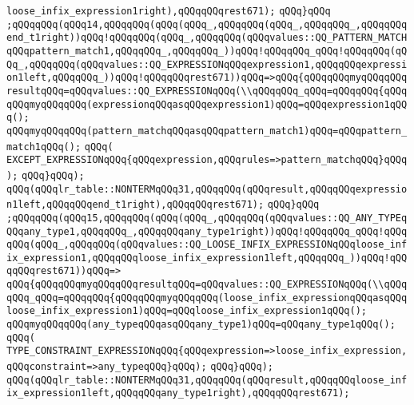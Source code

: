 \verb|loose_infix_expression1right),qQQqqQQqrest671);|\newline
\verb|qQQq}qQQq|\newline
\verb|;qQQqqQQq(qQQq14,qQQqqQQq(qQQq(qQQq_,qQQqqQQq(qQQq_,qQQqqQQq_,qQQqqQQqend_t1right))qQQq!qQQqqQQq(qQQq_,qQQqqQQq(qQQqvalues::QQ_PATTERN_MATCHqQQqpattern_match1,qQQqqQQq_,qQQqqQQq_))qQQq!qQQqqQQq_qQQq!qQQqqQQq(qQQq_,qQQqqQQq(qQQqvalues::QQ_EXPRESSIONqQQqexpression1,qQQqqQQqexpression1left,qQQqqQQq_))qQQq!qQQqqQQqrest671))qQQq=>qQQq{qQQqqQQqmyqQQqqQQq|\newline
\verb|resultqQQq=qQQqvalues::QQ_EXPRESSIONqQQq(\\qQQqqQQq_qQQq=qQQqqQQq{qQQqqQQqmyqQQqqQQq(expressionqQQqasqQQqexpression1)qQQq=qQQqexpression1qQQq();|\newline
\verb|qQQqmyqQQqqQQq(pattern_matchqQQqasqQQqpattern_match1)qQQq=qQQqpattern_match1qQQq();|\newline
\verb|qQQq(|\newline
\verb|EXCEPT_EXPRESSIONqQQq{qQQqexpression,qQQqrules=>pattern_matchqQQq}qQQq);|\newline
\verb|qQQq}qQQq);|\newline
\verb|qQQq(qQQqlr_table::NONTERMqQQq31,qQQqqQQq(qQQqresult,qQQqqQQqexpression1left,qQQqqQQqend_t1right),qQQqqQQqrest671);|\newline
\verb|qQQq}qQQq|\newline
\verb|;qQQqqQQq(qQQq15,qQQqqQQq(qQQq(qQQq_,qQQqqQQq(qQQqvalues::QQ_ANY_TYPEqQQqany_type1,qQQqqQQq_,qQQqqQQqany_type1right))qQQq!qQQqqQQq_qQQq!qQQqqQQq(qQQq_,qQQqqQQq(qQQqvalues::QQ_LOOSE_INFIX_EXPRESSIONqQQqloose_infix_expression1,qQQqqQQqloose_infix_expression1left,qQQqqQQq_))qQQq!qQQqqQQqrest671))qQQq=>|\newline
\verb|qQQq{qQQqqQQqmyqQQqqQQqresultqQQq=qQQqvalues::QQ_EXPRESSIONqQQq(\\qQQqqQQq_qQQq=qQQqqQQq{qQQqqQQqmyqQQqqQQq(loose_infix_expressionqQQqasqQQqloose_infix_expression1)qQQq=qQQqloose_infix_expression1qQQq();|\newline
\verb|qQQqmyqQQqqQQq(any_typeqQQqasqQQqany_type1)qQQq=qQQqany_type1qQQq();|\newline
\verb|qQQq(|\newline
\verb|TYPE_CONSTRAINT_EXPRESSIONqQQq{qQQqexpression=>loose_infix_expression,qQQqconstraint=>any_typeqQQq}qQQq);|\newline
\verb|qQQq}qQQq);|\newline
\verb|qQQq(qQQqlr_table::NONTERMqQQq31,qQQqqQQq(qQQqresult,qQQqqQQqloose_infix_expression1left,qQQqqQQqany_type1right),qQQqqQQqrest671);|\newline
